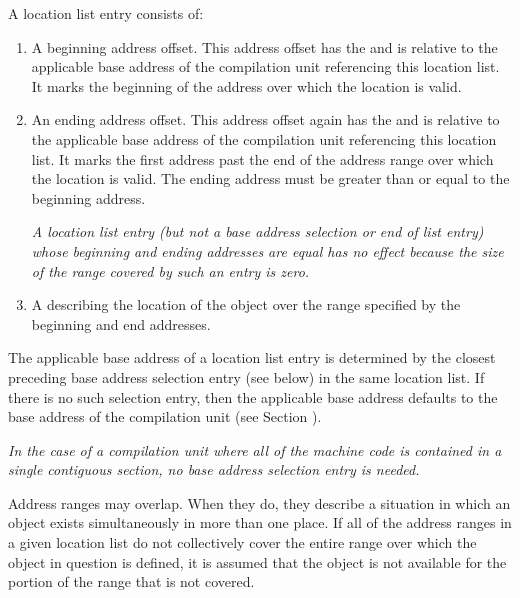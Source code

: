 A 
location list entry consists of:
\begin{enumerate}[1. ]
\item A beginning address offset. 
This address offset has the  and is
relative to the applicable base address of the compilation
unit referencing this location list. It marks the beginning
of the address 
over which the location is valid.

\item An ending address offset.  This address offset again
has the  and is relative to the applicable
base address of the compilation unit referencing this location
list. It marks the first address past the end of the address
range over which the location is valid. The ending address
must be greater than or equal to the beginning address.

\textit{A location list entry (but not a base address selection or 
end of list entry) whose beginning
and ending addresses are equal has no effect 
because the size of the range covered by such
an entry is zero.}

\item A  
describing the location of the object over the range specified by
the beginning and end addresses.
\end{enumerate}

The applicable base address of a 
location list entry is
determined by the closest preceding base address selection
entry (see below) in the same location list. If there is
no such selection entry, then the applicable base address
defaults to the base address of the compilation unit (see
Section ).  

\textit{In the case of a compilation unit where all of
the machine code is contained in a single contiguous section,
no base address selection entry is needed.}

Address ranges may overlap. When they do, they describe a
situation in which an object exists simultaneously in more than
one place. If all of the address ranges in a given location
list do not collectively cover the entire range over which the
object in question is defined, it is assumed that the object is
not available for the portion of the range that is not covered.

